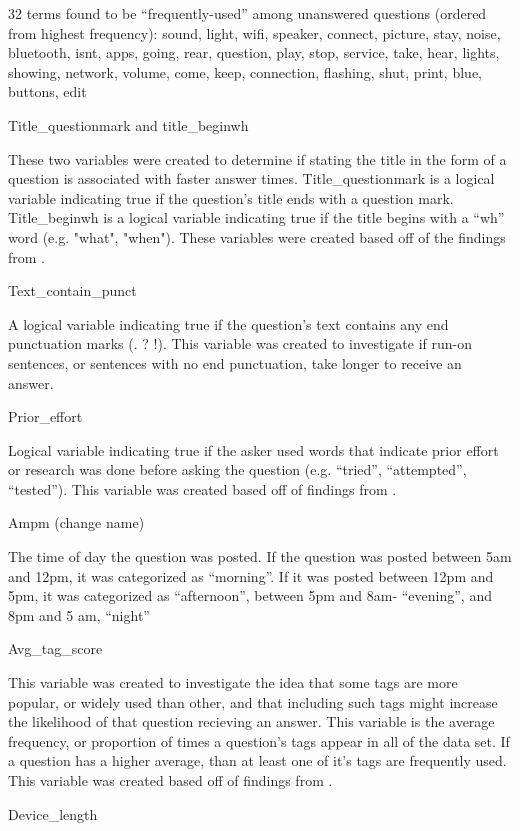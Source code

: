 \documentclass{article}
\begin{document}
32 terms found to be ``frequently-used'' among unanswered questions (ordered from highest frequency):
sound, light, wifi, speaker, connect, picture, stay, noise, bluetooth, isnt, apps, going, rear, question, play, stop, service, take, hear, lights, showing, network, volume, come, keep, connection, flashing, shut, print, blue, buttons, edit
  
Title\_questionmark and title\_beginwh 

These two variables were created to determine if stating the title in the form of a question is associated with faster answer times. Title_questionmark is a logical variable indicating true if the question's title ends with a question mark. Title_beginwh is a logical variable indicating true if the title begins with a “wh” word (e.g. "what", "when"). These variables were created based off of the findings from \citep{Bhat2014}. 
  
  
Text\_contain\_punct

A logical variable indicating true if the question’s text contains any end punctuation marks (. ? !). This variable was created to investigate if run-on sentences, or sentences with no end punctuation, take longer to receive an answer. 

Prior\_effort 

Logical variable indicating true if the asker used words that indicate prior effort or research was done before asking the question (e.g. ``tried'', ``attempted'', ``tested''). This variable was created based off of findings from \cite{Bhat2014}. 

Ampm (change name)

The time of day the question was posted. If the question was posted between 5am and 12pm, it was categorized as ``morning''. If it was posted between 12pm and 5pm, it was categorized as ``afternoon'', between 5pm and 8am- ``evening'', and 8pm and 5 am, ``night''

Avg\_tag\_score

This variable was created to investigate the idea that some tags are more popular, or widely used than other, and that including such tags might increase the likelihood of that question recieving an answer. This variable is the average frequency, or proportion of times a question's tags appear in all of the data set. If a question has a higher average, than at least one of it's tags are frequently used. This variable was created based off of findings from \cite{Bhat2014}. 


Device\_length
\end{document}
